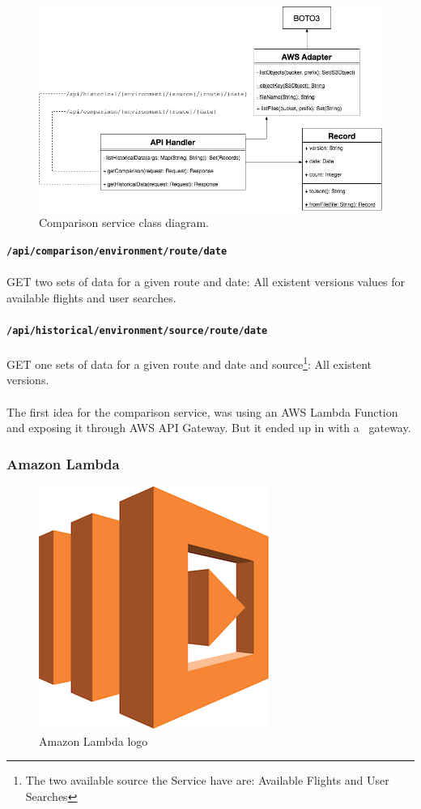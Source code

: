 \begin{figure}[H]
\centering
\includegraphics[scale=0.5]{diagrams/server-architecture.png}
\caption{Comparison service class diagram.}
\end{figure}

\textbf{\texttt{/api/comparison/{environment}/{route}/{date}}}
\\\\
GET two sets of data for a given route and date: All existent versions values for available flights and user searches.
\\\\
\textbf{\texttt{/api/historical/{environment}/{source}/{route}/{date}}}
\\\\
GET one sets of data for a given route and date and source\footnote{The two available source the Service have are: Available Flights and User Searches}: All existent versions. 
\\\\
The first idea for the comparison service, was using an AWS Lambda Function and exposing it through AWS API Gateway. But it ended up in  with a \company\ gateway.

\subsubsection*{Amazon Lambda} \label{lambda}

\begin{figure}[H]
\centering
\includegraphics[scale=0.1]{resources/lambda-logo.png}
\caption{Amazon Lambda logo}
\end{figure}

